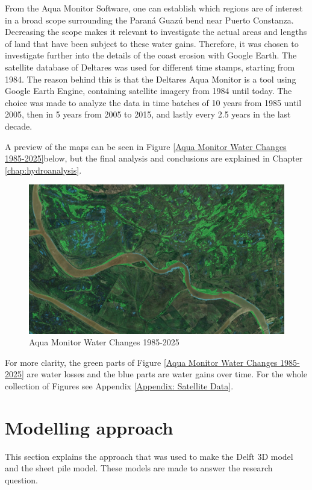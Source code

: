 From the Aqua Monitor Software, one can establish which regions are of interest in a broad scope surrounding the Paraná Guazú bend near Puerto Constanza. Decreasing the scope makes it relevant to investigate the actual areas and lengths of land that have been subject to these water gains. Therefore, it was chosen to investigate further into the details of the coast erosion with Google Earth. The satellite database of Deltares was used for different time stamps, starting from 1984. The reason behind this is that the Deltares Aqua Monitor is a tool using Google Earth Engine, containing satellite imagery from 1984 until today. The choice was made to analyze the data in time batches of 10 years from 1985 until 2005, then in 5 years from 2005 to 2015, and lastly every 2.5 years in the last decade.

A preview of the maps can be seen in Figure \ref{Aqua Monitor Water Changes 1985-2025}below, but the final analysis and conclusions are explained in Chapter \ref{chap:hydroanalysis}. 

\begin{figure}[H]
    \centering
    \includegraphics[width=0.75\linewidth]{figures/ch4/1985-2025.jpg}
    \caption{Aqua Monitor Water Changes 1985-2025}
\end{figure}
\label{Aqua Monitor Water Changes 1985-2025}

For more clarity, the green parts of Figure \ref{Aqua Monitor Water Changes 1985-2025} are water losses and the blue parts are water gains over time. For the whole collection of Figures see Appendix \ref{Appendix: Satellite Data}.

\section{Modelling approach}
This section explains the approach that was used to make the Delft 3D model and the sheet pile model. These models are made to answer the research question. 


